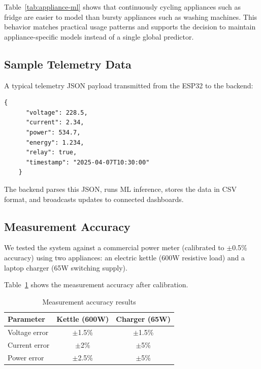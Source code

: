 \documentclass[12pt, a4paper]{article}
\numberwithin{figure}{section}
\numberwithin{table}{section}
\begin{document}
	Table~\ref{tab:appliance-ml} shows that continuously cycling appliances such as fridge are easier to model than bursty appliances such as washing machines. This behavior matches practical usage patterns and supports the decision to maintain appliance-specific models instead of a single global predictor.
	
	\subsection{Sample Telemetry Data}
	
	A typical telemetry JSON payload transmitted from the ESP32 to the backend:
	
	\begin{lstlisting}[basicstyle=\ttfamily\small, frame=single]
	{
	  "voltage": 228.5,
	  "current": 2.34,
	  "power": 534.7,
	  "energy": 1.234,
	  "relay": true,
	  "timestamp": "2025-04-07T10:30:00"
	}
	\end{lstlisting}
	
	The backend parses this JSON, runs ML inference, stores the data in CSV format, and broadcasts updates to connected dashboards.
	
	\subsection{Measurement Accuracy}
	
	We tested the system against a commercial power meter (calibrated to $\pm$0.5\% accuracy) using two appliances: an electric kettle (600W resistive load) and a laptop charger (65W switching supply).
	
	Table~\ref{tab:accuracy} shows the measurement accuracy after calibration.
	
	\begin{table}[H]
		\centering
		\caption{Measurement accuracy results}
		\label{tab:accuracy}
		\vspace{6pt}
		\begin{tabular}{|l|c|c|}
			\hline
			\textbf{Parameter} & \textbf{Kettle (600W)} & \textbf{Charger (65W)} \\
			\hline
			Voltage error & $\pm$1.5\% & $\pm$1.5\% \\
			\hline
			Current error & $\pm$2\% & $\pm$5\% \\
			\hline
			Power error & $\pm$2.5\% & $\pm$5\% \\
			\hline
		\end{tabular}
	\end{table}
	
\end{document}

